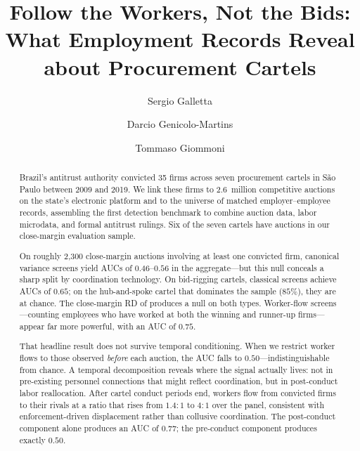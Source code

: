 \documentclass[12 pt]{elsarticle}
\begin{document}
\begin{frontmatter}
\title{\textbf{Follow the Workers, Not the Bids: What Employment Records Reveal about Procurement Cartels}}
\author[ETH]{Sergio Galletta}
\author[INSPER]{Darcio Genicolo-Martins}
\author[UvA]{Tommaso Giommoni}
\address[ETH]{ETH Zürich}
\address[INSPER]{INSPER}
\address[UvA]{University of Amsterdam}

\begin{abstract}
Brazil's antitrust authority convicted 35 firms across seven procurement cartels in S\~{a}o Paulo between 2009 and 2019. We link these firms to 2.6~million competitive auctions on the state's electronic platform and to the universe of matched employer--employee records, assembling the first detection benchmark to combine auction data, labor microdata, and formal antitrust rulings. Six of the seven cartels have auctions in our close-margin evaluation sample.

On roughly 2{,}300 close-margin auctions involving at least one convicted firm, canonical variance screens yield AUCs of $0.46$--$0.56$ in the aggregate---but this null conceals a sharp split by coordination technology. On bid-rigging cartels, classical screens achieve AUCs of $0.65$; on the hub-and-spoke cartel that dominates the sample ($85\%$), they are at chance. The close-margin RD of \citet{kawai2023using} produces a null on both types. Worker-flow screens---counting employees who have worked at both the winning and runner-up firms---appear far more powerful, with an AUC of $0.75$.

That headline result does not survive temporal conditioning. When we restrict worker flows to those observed \emph{before} each auction, the AUC falls to $0.50$---indistinguishable from chance. A temporal decomposition reveals where the signal actually lives: not in pre-existing personnel connections that might reflect coordination, but in post-conduct labor reallocation. After cartel conduct periods end, workers flow from convicted firms to their rivals at a ratio that rises from $1.4{:}1$ to $4{:}1$ over the panel, consistent with enforcement-driven displacement rather than collusive coordination. The post-conduct component alone produces an AUC of $0.77$; the pre-conduct component produces exactly $0.50$.


\end{abstract}
\end{frontmatter}
\end{document}

